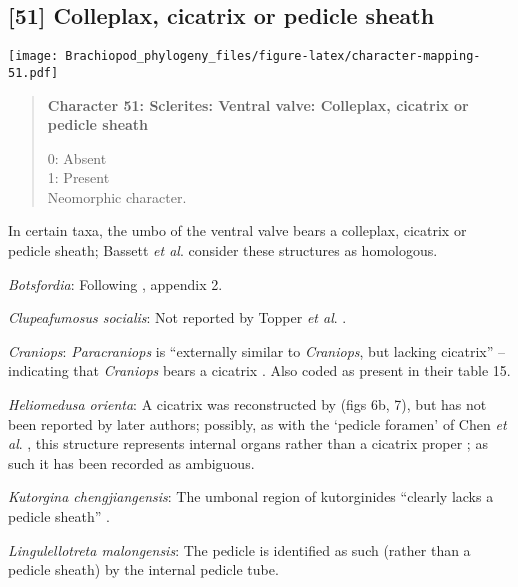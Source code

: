 \documentclass[openany]{book}
\theoremstyle{definition}
\theoremstyle{definition}
\theoremstyle{definition}
\theoremstyle{remark}
\begin{document}
\subsection*{{[}51{]} Colleplax, cicatrix or pedicle
sheath}\label{colleplax-cicatrix-or-pedicle-sheath}

\texttt{[image: Brachiopod\_phylogeny\_files/figure-latex/character-mapping-51.pdf]}

\begin{quote}
\textbf{Character 51: Sclerites: Ventral valve: Colleplax, cicatrix or
pedicle sheath}

0: Absent\\
1: Present\\
Neomorphic character.
\end{quote}

In certain taxa, the umbo of the ventral valve bears a colleplax,
cicatrix or pedicle sheath; Bassett \emph{et al}.
\citeyearpar{Bassett2008Earlyontogeny} consider these structures as
homologous.

\hypertarget{Botsfordia-coding-51}{}
\emph{Botsfordia}: Following \citet{Williams1998Thediversity}, appendix
2.

\hypertarget{Clupeafumosus_socialis-coding-51}{}
\emph{Clupeafumosus socialis}: Not reported by Topper \emph{et al}.
\citeyearpar{Topper2013Reappraisalof}.

\hypertarget{Craniops-coding-51}{}
\emph{Craniops}: \emph{Paracraniops} is ``externally similar to
\emph{Craniops}, but lacking cicatrix'' -- indicating that
\emph{Craniops} bears a cicatrix
\citep{Williams2000LinguliformeaCraniiformea}. Also coded as present in
their table 15.

\hypertarget{Heliomedusa_orienta-coding-51}{}
\emph{Heliomedusa orienta}: A cicatrix was reconstructed by
\citet{Jin1992Revisionof} (figs 6b, 7), but has not been reported by
later authors; possibly, as with the `pedicle foramen' of Chen \emph{et
al}. \citeyearpar{Chen2007Reinterpretationof}, this structure represents
internal organs rather than a cicatrix proper
\citep{Zhang2009Architectureand}; as such it has been recorded as
ambiguous.

\hypertarget{Kutorgina_chengjiangensis-coding-51}{}
\emph{Kutorgina chengjiangensis}: The umbonal region of kutorginides
``clearly lacks a pedicle sheath'' \citep{Holmer2018Theattachment}.

\hypertarget{Lingulellotreta_malongensis-coding-51}{}
\emph{Lingulellotreta malongensis}: The pedicle is identified as such
(rather than a pedicle sheath) by the internal pedicle tube.
\end{document}
